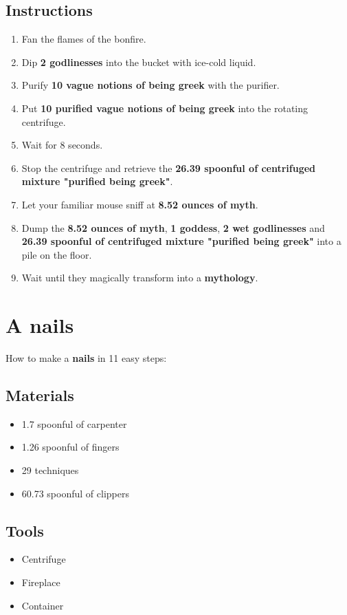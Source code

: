 \documentclass{article}
\begin{document}
\subsection{Instructions}\begin{enumerate}
\item 
Fan the flames of the bonfire.
\item 
Dip \textbf{2 godlinesses} into the bucket with ice-cold liquid.
\item 
Purify \textbf{10 vague notions of being greek} with the purifier.
\item 
Put \textbf{10 purified vague notions of being greek} into the rotating centrifuge.
\item 
Wait for 8 seconds.
\item 
Stop the centrifuge and retrieve the \textbf{26.39 spoonful of centrifuged mixture "purified being greek"}.
\item 
Let your familiar mouse sniff at \textbf{8.52 ounces of myth}.
\item 
Dump the \textbf{8.52 ounces of myth}, \textbf{1 goddess}, \textbf{2 wet godlinesses} and \textbf{26.39 spoonful of centrifuged mixture "purified being greek"} into a pile on the floor.
\item 
Wait until they magically transform into a \textbf{mythology}.
\end{enumerate}
\newpage
\section{A nails}How to make a \textbf{nails} in 11 easy steps:

\subsection{Materials}\begin{itemize}
\item 
1.7 spoonful of carpenter
\item 
1.26 spoonful of fingers
\item 
29 techniques
\item 
60.73 spoonful of clippers
\end{itemize}
\subsection{Tools}\begin{itemize}
\item 
Centrifuge
\item 
Fireplace
\item 
Container
\end{itemize}
\end{document}
